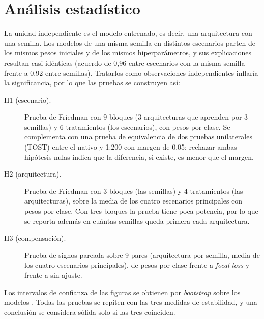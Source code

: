 \section{Análisis estadístico}\label{sec:estadistica}

La unidad independiente es el modelo entrenado, es decir, una arquitectura con una semilla.
Los modelos de una misma semilla en distintos escenarios parten de los mismos pesos iniciales y
de los mismos hiperparámetros, y sus explicaciones resultan casi idénticas (acuerdo de 0,96
entre escenarios con la misma semilla frente a 0,92 entre semillas). Tratarlos como
observaciones independientes inflaría la significancia, por lo que las pruebas se construyen
así:

\begin{description}
  \item[H1 (escenario).] Prueba de Friedman \cite{Friedman1937} con 9 bloques (3 arquitecturas
        que aprenden por 3 semillas) y 6 tratamientos (los escenarios), con pesos por clase. Se
        complementa con una prueba de equivalencia de dos pruebas unilaterales (TOST)
        \cite{Lakens2017TOST} entre el nativo y 1:200 con margen de 0,05: rechazar ambas
        hipótesis nulas indica que la diferencia, si existe, es menor que el margen.
  \item[H2 (arquitectura).] Prueba de Friedman con 3 bloques (las semillas) y 4 tratamientos
        (las arquitecturas), sobre la media de los cuatro escenarios principales con pesos por
        clase. Con tres bloques la prueba tiene poca potencia, por lo que se reporta además en
        cuántas semillas queda primera cada arquitectura.
  \item[H3 (compensación).] Prueba de signos pareada sobre 9 pares (arquitectura por semilla,
        media de los cuatro escenarios principales), de pesos por clase frente a
        \textit{focal loss} y frente a sin ajuste.
\end{description}

Los intervalos de confianza de las figuras se obtienen por \textit{bootstrap} sobre los
modelos \cite{Efron1979Bootstrap}. Todas las pruebas se repiten con las tres medidas de
estabilidad, y una conclusión se considera sólida solo si las tres coinciden.
